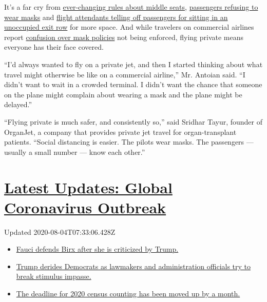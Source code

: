 It's a far cry from
\href{https://www.nytimes3xbfgragh.onion/2020/07/10/world/canada/canada-airlines-coronavirus.html}{ever-changing
rules about middle seats},
\href{https://www.nytimes3xbfgragh.onion/2020/06/18/us/american-airlines-mask-brandon-straka.html}{passengers
refusing to wear masks} and
\href{https://www.nytimes3xbfgragh.onion/2020/07/08/travel/airplanes-social-distancing-coronavirus.html}{flight
attendants telling off passengers for sitting in an unoccupied exit row}
for more space. And while travelers on commercial airlines report
\href{https://www.nytimes3xbfgragh.onion/2020/06/04/travel/coronavirus-flying-face-masks.html}{confusion
over mask policies} not being enforced, flying private means everyone
has their face covered.

``I'd always wanted to fly on a private jet, and then I started thinking
about what travel might otherwise be like on a commercial airline,'' Mr.
Antoian said. ``I didn't want to wait in a crowded terminal. I didn't
want the chance that someone on the plane might complain about wearing a
mask and the plane might be delayed.''

``Flying private is much safer, and consistently so,'' said Sridhar
Tayur, founder of OrganJet, a company that provides private jet travel
for organ-transplant patients. ``Social distancing is easier. The pilots
wear masks. The passengers --- usually a small number --- know each
other.''

\hypertarget{latest-updates-global-coronavirus-outbreak}{%
\section{\texorpdfstring{\href{https://www.nytimes3xbfgragh.onion/2020/08/03/world/coronavirus-covid-19.html?action=click\&pgtype=Article\&state=default\&region=MAIN_CONTENT_1\&context=storylines_live_updates}{Latest
Updates: Global Coronavirus
Outbreak}}{Latest Updates: Global Coronavirus Outbreak}}\label{latest-updates-global-coronavirus-outbreak}}

Updated 2020-08-04T07:33:06.428Z

\begin{itemize}
\tightlist
\item
  \href{https://www.nytimes3xbfgragh.onion/2020/08/03/world/coronavirus-covid-19.html?action=click\&pgtype=Article\&state=default\&region=MAIN_CONTENT_1\&context=storylines_live_updates\#link-4547638f}{Fauci
  defends Birx after she is criticized by Trump.}
\item
  \href{https://www.nytimes3xbfgragh.onion/2020/08/03/world/coronavirus-covid-19.html?action=click\&pgtype=Article\&state=default\&region=MAIN_CONTENT_1\&context=storylines_live_updates\#link-15e7f995}{Trump
  derides Democrats as lawmakers and administration officials try to
  break stimulus impasse.}
\item
  \href{https://www.nytimes3xbfgragh.onion/2020/08/03/world/coronavirus-covid-19.html?action=click\&pgtype=Article\&state=default\&region=MAIN_CONTENT_1\&context=storylines_live_updates\#link-e5a2cda}{The
  deadline for 2020 census counting has been moved up by a month.}
\end{itemize}

